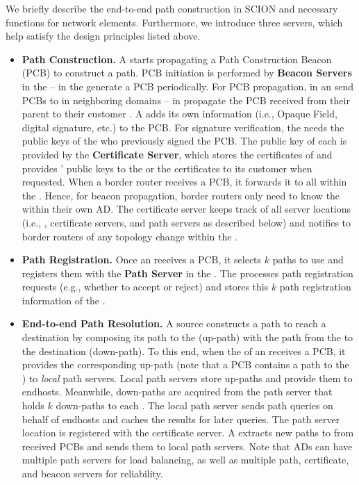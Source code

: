 We briefly describe the end-to-end path construction in SCION and necessary functions for network elements. Furthermore, we introduce three servers, which help satisfy the design principles listed above.
\begin{itemize}
\item {\bf Path Construction. } A \ISDC starts propagating a Path Construction
  Beacon (PCB) to construct a path. PCB initiation is performed by {\bf Beacon
    Servers} in the \ISDC -- \BSs in the \ISDC generate a PCB
  periodically. For PCB propagation, \BSs in an \AD send PCBs to
  \BSs in neighboring domains -- \BSs in \TRAN \ADs
  propagate the PCB received from their parent \AD to their customer \ADs. A
  \BS adds its own \AD information (i.e., Opaque Field, digital
  signature, etc.) to the PCB. For signature verification, the \BS
  needs the public keys of the \AD who previously signed the PCB. The public key
  of each \AD is provided by the {\bf Certificate Server}, which stores the
  certificates of \ADs and provides \ADs' public keys to the \BS or
  the certificates to its customer \ADs when requested. When a border router
  receives a PCB, it forwards it to all \BSs within the \AD. Hence,
  for beacon propagation, border routers only need to know the \BSs
  within their own AD. The certificate server keeps track of all server
  locations (i.e., \BSs, certificate servers, and path servers as
  described below) and notifies to border routers of any topology change within
  the \AD.

\item {\bf Path Registration. } Once an \STUB \AD receives a PCB, it selects $k$
  paths to use and registers them with the {\bf Path Server} in the \ISDC. The \ISDC \PS
  processes path registration requests (e.g., whether to accept or reject) and
  stores this $k$ path registration information of the \STUB \AD.

\item {\bf End-to-end Path Resolution. }  A source \AD constructs a path to
  reach a destination \AD by composing its path to the \ISDC (up-path) with the
  path from the \ISDC to the destination \AD (down-path). To this end, when the
  \BS of an \AD receives a PCB, it provides the corresponding up-path (note that
  a PCB contains a path to the \ISDC) to {\em local} path servers. Local path
  servers store up-paths and provide them to endhosts. Meanwhile, down-paths are
  acquired from the \ISDC path server that holds $k$ down-paths to each \AD. The
  local path server sends path queries on behalf of endhosts and caches the
  results for later queries. The path server location is registered with the
  certificate server. A \BS extracts new paths to \ISDC from received PCBs and
  sends them to local path servers. Note that ADs can have multiple path servers
  for load balancing, as well as multiple path, certificate, and beacon servers
  for reliability.


\end{itemize}
